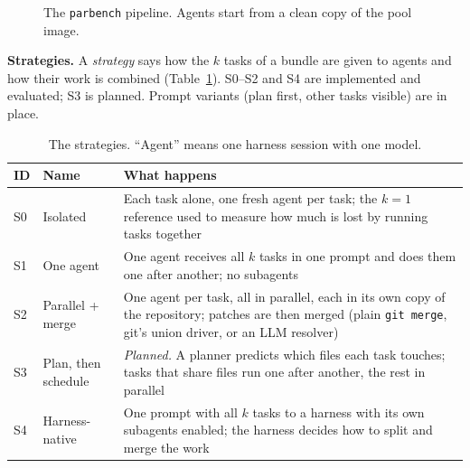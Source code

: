\documentclass[sigconf,nonacm]{acmart}
\begin{document}
\begin{figure}[t]
\centering
{}
\caption{The \texttt{parbench} pipeline. Agents start from a clean copy of the pool image.}
\label{fig:pipe}
\end{figure}

\textbf{Strategies.} A \emph{strategy} says how the $k$ tasks of a bundle are given to agents and how their work is combined (Table~\ref{tab:strat}). S0--S2 and S4 are implemented and evaluated; S3 is planned. Prompt variants (plan first, other tasks visible) are in place.
\begin{table}[t]
\caption{The strategies. ``Agent'' means one harness session with one model.}
\label{tab:strat}
\footnotesize
\renewcommand{\arraystretch}{1.15}
\begin{tabular}{@{}lp{}p{}@{}}
\toprule
ID & Name & What happens \\
\midrule
S0 & Isolated & Each task alone, one fresh agent per task; the $k{=}1$ reference used to measure how much is lost by running tasks together \\
S1 & One agent & One agent receives all $k$ tasks in one prompt and does them one after another; no subagents \\
S2 & Parallel + merge & One agent per task, all in parallel, each in its own copy of the repository; patches are then merged (plain \texttt{git merge}, git's union driver, or an LLM resolver) \\
S3 & Plan, then schedule & \emph{Planned.} A planner predicts which files each task touches; tasks that share files run one after another, the rest in parallel \\
S4 & Harness-native & One prompt with all $k$ tasks to a harness with its own subagents enabled; the harness decides how to split and merge the work \\
\bottomrule
\end{tabular}
\end{table}
\end{document}
